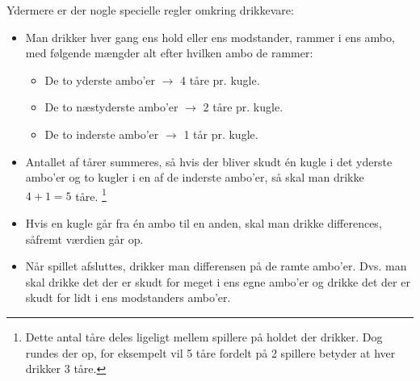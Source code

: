 Ydermere er der nogle specielle regler omkring drikkevare:
\begin{itemize}
	\item Man drikker hver gang ens hold eller ens modstander, rammer i ens ambo, med følgende mængder alt efter hvilken ambo de rammer:
	\begin{itemize}
		\item De to yderste ambo'er $\rightarrow$ 4 tåre pr. kugle.
		\item De to næstyderste ambo'er $\rightarrow$ 2 tåre pr. kugle.
		\item De to inderste ambo'er $\rightarrow$ 1 tår pr. kugle.
	\end{itemize}	
		\item Antallet af tårer summeres, så hvis der bliver skudt én kugle i det yderste ambo'er og to kugler i en af de inderste ambo'er, så skal man drikke $4 + 1 = 5$ tåre. \footnote{Dette antal tåre deles ligeligt mellem spillere på holdet der drikker. Dog rundes der op, for eksempelt vil 5 tåre fordelt på 2 spillere betyder at hver drikker 3 tåre.}
	\item Hvis en kugle går fra én ambo til en anden, skal man drikke differences, såfremt værdien går op.
	\item Når spillet afsluttes, drikker man differensen på de ramte ambo'er. Dvs. man skal drikke det der er skudt for meget i ens egne ambo'er og drikke det der er skudt for lidt i ens modstanders ambo'er. 
\end{itemize}



